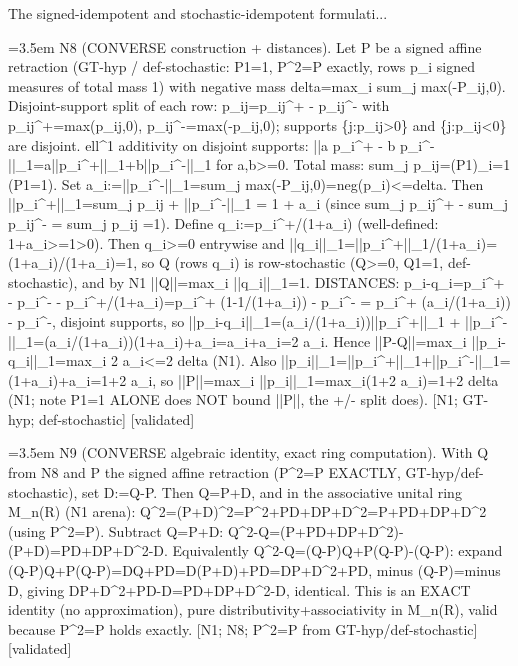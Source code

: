 \documentclass{article}
\newcommand{\step}[1]{\par\noindent\hangindent=3.5em\hangafter=1%
  \makebox[3.5em][l]{\textbf{#1.}}}
\newcommand{\steptag}[1]{\hfill{\small\textsf{[#1]}}}
\begin{document}
\begin{proofbox}{The signed-idempotent and stochastic-idempotent formulati...}
\step{1.8} N8 (CONVERSE construction + distances). Let P be a signed affine retraction (GT-hyp / def-stochastic: P1=1, P\textasciicircum{}2=P exactly, rows p\_i signed measures of total mass 1) with negative mass delta=max\_i sum\_j max(-P\_ij,0). Disjoint-support split of each row: p\_ij=p\_ij\textasciicircum{}+ - p\_ij\textasciicircum{}- with p\_ij\textasciicircum{}+=max(p\_ij,0), p\_ij\textasciicircum{}-=max(-p\_ij,0); supports \{j:p\_ij>0\} and \{j:p\_ij<0\} are disjoint. ell\textasciicircum{}1 additivity on disjoint supports: ||a p\_i\textasciicircum{}+ - b p\_i\textasciicircum{}-||\_1=a||p\_i\textasciicircum{}+||\_1+b||p\_i\textasciicircum{}-||\_1 for a,b>=0. Total mass: sum\_j p\_ij=(P1)\_i=1 (P1=1). Set a\_i:=||p\_i\textasciicircum{}-||\_1=sum\_j max(-P\_ij,0)=neg(p\_i)<=delta. Then ||p\_i\textasciicircum{}+||\_1=sum\_j p\_ij + ||p\_i\textasciicircum{}-||\_1 = 1 + a\_i (since sum\_j p\_ij\textasciicircum{}+ - sum\_j p\_ij\textasciicircum{}- = sum\_j p\_ij =1). Define q\_i:=p\_i\textasciicircum{}+/(1+a\_i) (well-defined: 1+a\_i>=1>0). Then q\_i>=0 entrywise and ||q\_i||\_1=||p\_i\textasciicircum{}+||\_1/(1+a\_i)=(1+a\_i)/(1+a\_i)=1, so Q (rows q\_i) is row-stochastic (Q>=0, Q1=1, def-stochastic), and by N1 ||Q||=max\_i ||q\_i||\_1=1. DISTANCES: p\_i-q\_i=p\_i\textasciicircum{}+ - p\_i\textasciicircum{}- - p\_i\textasciicircum{}+/(1+a\_i)=p\_i\textasciicircum{}+ (1-1/(1+a\_i)) - p\_i\textasciicircum{}- = p\_i\textasciicircum{}+ (a\_i/(1+a\_i)) - p\_i\textasciicircum{}-, disjoint supports, so ||p\_i-q\_i||\_1=(a\_i/(1+a\_i))||p\_i\textasciicircum{}+||\_1 + ||p\_i\textasciicircum{}-||\_1=(a\_i/(1+a\_i))(1+a\_i)+a\_i=a\_i+a\_i=2 a\_i. Hence ||P-Q||=max\_i ||p\_i-q\_i||\_1=max\_i 2 a\_i<=2 delta (N1). Also ||p\_i||\_1=||p\_i\textasciicircum{}+||\_1+||p\_i\textasciicircum{}-||\_1=(1+a\_i)+a\_i=1+2 a\_i, so ||P||=max\_i ||p\_i||\_1=max\_i(1+2 a\_i)=1+2 delta (N1; note P1=1 ALONE does NOT bound ||P||, the +/- split does). [N1; GT-hyp; def-stochastic] \steptag{validated} \\[4pt]
\step{1.9} N9 (CONVERSE algebraic identity, exact ring computation). With Q from N8 and P the signed affine retraction (P\textasciicircum{}2=P EXACTLY, GT-hyp/def-stochastic), set D:=Q-P. Then Q=P+D, and in the associative unital ring M\_n(R) (N1 arena): Q\textasciicircum{}2=(P+D)\textasciicircum{}2=P\textasciicircum{}2+PD+DP+D\textasciicircum{}2=P+PD+DP+D\textasciicircum{}2 (using P\textasciicircum{}2=P). Subtract Q=P+D: Q\textasciicircum{}2-Q=(P+PD+DP+D\textasciicircum{}2)-(P+D)=PD+DP+D\textasciicircum{}2-D. Equivalently Q\textasciicircum{}2-Q=(Q-P)Q+P(Q-P)-(Q-P): expand (Q-P)Q+P(Q-P)=DQ+PD=D(P+D)+PD=DP+D\textasciicircum{}2+PD, minus (Q-P)=minus D, giving DP+D\textasciicircum{}2+PD-D=PD+DP+D\textasciicircum{}2-D, identical. This is an EXACT identity (no approximation), pure distributivity+associativity in M\_n(R), valid because P\textasciicircum{}2=P holds exactly. [N1; N8; P\textasciicircum{}2=P from GT-hyp/def-stochastic] \steptag{validated} \\[4pt]

\end{proofbox}
\end{document}
